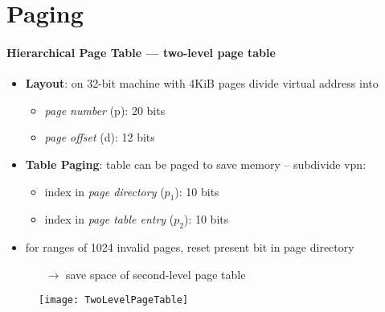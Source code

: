 \section{Paging}

\paragraph{Hierarchical Page Table --- two-level page table}
\begin{itemize}
  \item \textbf{Layout}: on 32-bit machine with 4KiB pages divide virtual address into
  \begin{itemize}
    \item \emph{page number} (p): 20 bits
    \item \emph{page offset} (d): 12 bits
  \end{itemize}
  \item \textbf{Table Paging}: table can be paged to save memory -- subdivide vpn:
  \begin{itemize}
    \item index in \emph{page directory} ($ p_1 $): 10 bits
    \item index in \emph{page table entry} ($ p_2 $): 10 bits
  \end{itemize}
  \item for ranges of 1024 invalid pages, reset present bit in page directory
  \begin{itemize}
    \item[$ \to $] save space of second-level page table
  \end{itemize}
\end{itemize}
\begin{figure}[h]\centering\label{TwoLevelPageTable}\texttt{[image: TwoLevelPageTable]}\end{figure}

